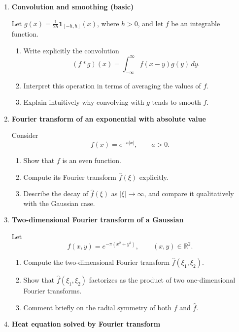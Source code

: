 \documentclass[11pt]{article}
\begin{document}
\begin{enumerate}
\bigskip

\item \textbf{Convolution and smoothing (basic)}

Let \(g(x)=\frac{1}{2h}\mathbf{1}_{[-h,h]}(x)\), where \(h>0\), and let \(f\) be an integrable function.

\begin{enumerate}
\item Write explicitly the convolution
\[
(f*g)(x) = \int_{-\infty}^{\infty} f(x-y)g(y)\,dy.
\]
\item Interpret this operation in terms of averaging the values of \(f\).
\item Explain intuitively why convolving with \(g\) tends to smooth \(f\).
\end{enumerate}

\bigskip
\item \textbf{Fourier transform of an exponential with absolute value}

Consider
\[
f(x)=e^{-a|x|}, \qquad a>0.
\]

\begin{enumerate}
\item Show that \(f\) is an even function.
\item Compute its Fourier transform \(\hat f(\xi)\) explicitly.
\item Describe the decay of \(\hat f(\xi)\) as \(|\xi|\to\infty\), and compare it qualitatively with the Gaussian case.
\end{enumerate}

\bigskip
\item \textbf{Two-dimensional Fourier transform of a Gaussian}

Let
\[
f(x,y)=e^{-\pi(x^2+y^2)}, \qquad (x,y)\in\mathbb{R}^2.
\]

\begin{enumerate}
\item Compute the two-dimensional Fourier transform \(\hat f(\xi_1,\xi_2)\).
\item Show that \(\hat f(\xi_1,\xi_2)\) factorizes as the product of two one-dimensional Fourier transforms.
\item Comment briefly on the radial symmetry of both \(f\) and \(\hat f\).
\end{enumerate}

\bigskip
\item \textbf{Heat equation solved by Fourier transform}


\end{enumerate}
\end{document}

